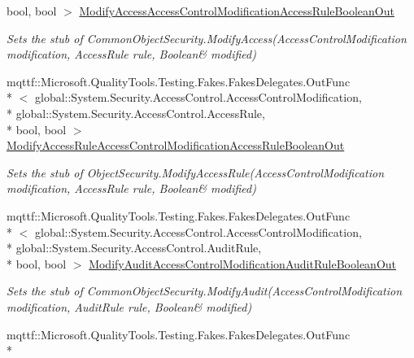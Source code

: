 \begin{DoxyCompactItemize}
bool, bool $>$ \hyperlink{class_system_1_1_security_1_1_access_control_1_1_fakes_1_1_stub_common_object_security_a4698d50721edf758bc6897d9e42b88e9}{Modify\-Access\-Access\-Control\-Modification\-Access\-Rule\-Boolean\-Out}
\begin{DoxyCompactList}\small\item\em Sets the stub of Common\-Object\-Security.\-Modify\-Access(Access\-Control\-Modification modification, Access\-Rule rule, Boolean\& modified)\end{DoxyCompactList}\item 
mqttf\-::\-Microsoft.\-Quality\-Tools.\-Testing.\-Fakes.\-Fakes\-Delegates.\-Out\-Func\\*
$<$ global\-::\-System.\-Security.\-Access\-Control.\-Access\-Control\-Modification, \\*
global\-::\-System.\-Security.\-Access\-Control.\-Access\-Rule, \\*
bool, bool $>$ \hyperlink{class_system_1_1_security_1_1_access_control_1_1_fakes_1_1_stub_common_object_security_aeecbf15f5ef875d79078dff9fbb8213d}{Modify\-Access\-Rule\-Access\-Control\-Modification\-Access\-Rule\-Boolean\-Out}
\begin{DoxyCompactList}\small\item\em Sets the stub of Object\-Security.\-Modify\-Access\-Rule(Access\-Control\-Modification modification, Access\-Rule rule, Boolean\& modified)\end{DoxyCompactList}\item 
mqttf\-::\-Microsoft.\-Quality\-Tools.\-Testing.\-Fakes.\-Fakes\-Delegates.\-Out\-Func\\*
$<$ global\-::\-System.\-Security.\-Access\-Control.\-Access\-Control\-Modification, \\*
global\-::\-System.\-Security.\-Access\-Control.\-Audit\-Rule, \\*
bool, bool $>$ \hyperlink{class_system_1_1_security_1_1_access_control_1_1_fakes_1_1_stub_common_object_security_a0010943d7702ef60abe177c4b5ba8617}{Modify\-Audit\-Access\-Control\-Modification\-Audit\-Rule\-Boolean\-Out}
\begin{DoxyCompactList}\small\item\em Sets the stub of Common\-Object\-Security.\-Modify\-Audit(Access\-Control\-Modification modification, Audit\-Rule rule, Boolean\& modified)\end{DoxyCompactList}\item 
mqttf\-::\-Microsoft.\-Quality\-Tools.\-Testing.\-Fakes.\-Fakes\-Delegates.\-Out\-Func\\*

\end{DoxyCompactItemize}
